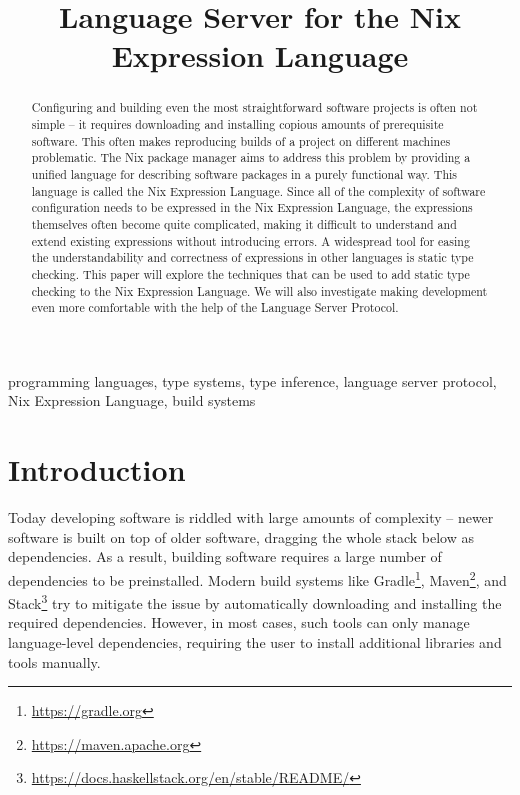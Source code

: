 \documentclass[a4paper,conference]{IEEEtran}
\title{Language Server for the Nix Expression Language}
\author{
  \IEEEauthorblockN{Kostyuchenko Ilya}
  \IEEEauthorblockA{
    Faculty of Computer Science,\\
    Higher School of Economics,\\
    Moscow, Russia
  }
}
\begin{document}
\maketitle

\begin{abstract}
  Configuring and building even the most straightforward software projects is often not simple -- it requires downloading and installing copious amounts of prerequisite software. This often makes reproducing builds of a project on different machines problematic. The Nix package manager aims to address this problem by providing a unified language for describing software packages in a purely functional way. This language is called the Nix Expression Language. Since all of the complexity of software configuration needs to be expressed in the Nix Expression Language, the expressions themselves often become quite complicated, making it difficult to understand and extend existing expressions without introducing errors. A widespread tool for easing the understandability and correctness of expressions in other languages is static type checking. This paper will explore the techniques that can be used to add static type checking to the Nix Expression Language. We will also investigate making development even more comfortable with the help of the Language Server Protocol.
\end{abstract}

\begin{IEEEkeywords}
  programming languages, type systems, type inference, language server protocol, Nix Expression Language, build systems
\end{IEEEkeywords}

\section{Introduction}

Today developing software is riddled with large amounts of complexity -- newer software is built on top of older software, dragging the whole stack below as dependencies. As a result, building software requires a large number of dependencies to be preinstalled. Modern build systems like Gradle\footnote{\url{https://gradle.org}}, Maven\footnote{\url{https://maven.apache.org}}, and Stack\footnote{\url{https://docs.haskellstack.org/en/stable/README/}} try to mitigate the issue by automatically downloading and installing the required dependencies. However, in most cases, such tools can only manage language-level dependencies, requiring the user to install additional libraries and tools manually.
\end{document}

